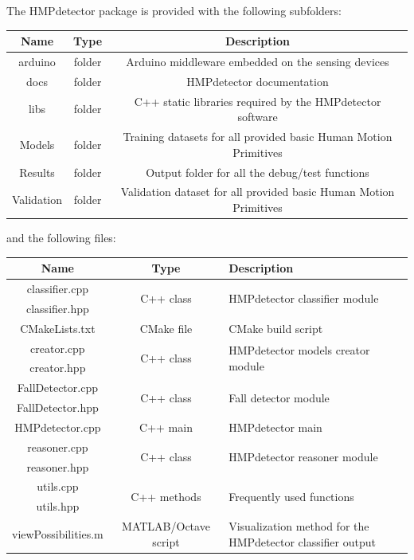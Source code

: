 \documentclass[10pt,a4paper]{report}
\begin{document}
The HMPdetector package is provided with the following subfolders:
\begin{center}
\begin{tabular}{|c|c|c|}
\hline
\textbf{Name} & \textbf{Type} & \textbf{Description}\\
\hline
arduino & folder & Arduino middleware embedded on the sensing devices\\
\hline
docs & folder & HMPdetector documentation\\
\hline
libs & folder & C++ static libraries required by the HMPdetector software\\
\hline
Models & folder & Training datasets for all provided basic Human Motion Primitives\\
\hline
Results & folder & Output folder for all the debug/test functions\\
\hline
Validation & folder & Validation dataset for all provided basic Human Motion Primitives\\
\hline
\end{tabular}
\end{center}
and the following files:
\begin{center}
\begin{tabular}{|c|c|p{6cm}|}
\hline
\textbf{Name} & \textbf{Type} & \textbf{Description}\\
\hline
classifier.cpp & \multirow{2}{*}{C++ class} & \multirow{2}{*}{HMPdetector classifier module}\\
\cline{1-1}
classifier.hpp & & \\
\hline
CMakeLists.txt & CMake file & CMake build script\\
\hline
creator.cpp & \multirow{2}{*}{C++ class} & \multirow{2}{*}{HMPdetector models creator module}\\
\cline{1-1}
creator.hpp & & \\
\hline
FallDetector.cpp & \multirow{2}{*}{C++ class} & \multirow{2}{*}{Fall detector module}\\
\cline{1-1}
FallDetector.hpp & & \\
\hline
HMPdetector.cpp & C++ main & HMPdetector main\\
\hline
reasoner.cpp & \multirow{2}{*}{C++ class} & \multirow{2}{*}{HMPdetector reasoner module}\\
\cline{1-1}
reasoner.hpp & & \\
\hline
utils.cpp & \multirow{2}{*}{C++ methods} & \multirow{2}{*}{Frequently used functions}\\
\cline{1-1}
utils.hpp & & \\
\hline
viewPossibilities.m & MATLAB/Octave script & Visualization method for the HMPdetector classifier output\\
\hline
\end{tabular}
\end{center}
\end{document}
